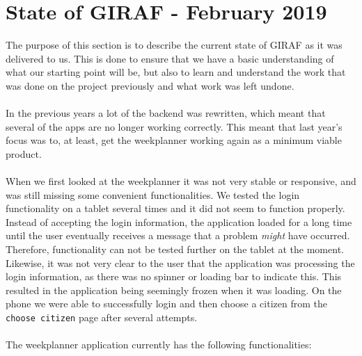 \section{State of GIRAF - February 2019}\label{sec:stateOfGirafFeb2019}
The purpose of this section is to describe the current state of GIRAF as it was delivered to us.
This is done to ensure that we have a basic understanding of what our starting point will be, but also to learn and understand the work that was done on the project previously and what work was left undone.
\\\\
In the previous years a lot of the backend was rewritten, which meant that several of the apps are no longer working correctly.
This meant that last year's focus was to, at least, get the weekplanner working again as a minimum viable product.
\\\\
When we first looked at the weekplanner it was not very stable or responsive, and was still missing some convenient functionalities.
We tested the login functionality on a tablet several times and it did not seem to function properly.
Instead of accepting the login information, the application loaded for a long time until the user eventually receives a message that a problem \textit{might} have occurred.
Therefore, functionality can not be tested further on the tablet at the moment.
Likewise, it was not very clear to the user that the application was processing the login information, as there was no spinner or loading bar to indicate this.
This resulted in the application being seemingly frozen when it was loading.
On the phone we were able to successfully login and then choose a citizen from the \texttt{choose citizen} page after several attempts.
\\\\
The weekplanner application currently has the following functionalities:
